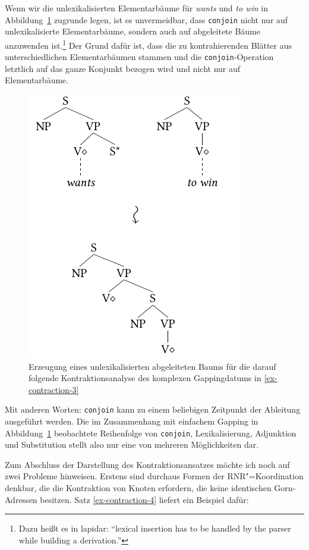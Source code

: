 Wenn wir die unlexikalisierten Elementarbäume für {\it wants} und {\it to win} in Abbildung~\ref{fig-contraction-4} zugrunde legen, ist es unvermeidbar, dass {\tt conjoin} nicht nur auf unlexikalisierte Elementarbäume, sondern auch auf abgeleitete Bäume anzuwenden ist.\footnote{Dazu hei\ss t es in \citet[21]{Sarkar:Joshi:97} lapidar: "`lexical insertion has to be handled by the parser while building a derivation."'} Der Grund dafür ist, dass die zu kontrahierenden Blätter aus unterschiedlichen Elementarbäumen stammen und die {\tt conjoin}-Operation letztlich auf das ganze Konjunkt bezogen wird und nicht nur auf Elementarbäume.
\begin{figure}[t]
\centering
\includegraphics{graphics/abb89.pdf}
\caption{\label{fig-contraction-4}Erzeugung eines unlexikalisierten abgeleiteten Baums für die darauf folgende Kontraktionsanalyse des komplexen Gappingdatums in \ref{ex-contraction-3}}
\end{figure}
Mit anderen Worten: {\tt conjoin} kann zu einem beliebigen Zeitpunkt der Ableitung ausgeführt werden. Die im Zusammenhang mit einfachem Gapping in Abbildung~\ref{fig-contraction-4} beobachtete Reihenfolge von {\tt conjoin}, Lexikalisierung, Adjunktion und Substitution stellt also nur eine von mehreren Möglichkeiten dar.%

Zum Abschluss der Darstellung des Kontraktionsansatzes möchte ich noch auf zwei Probleme hinweisen. Erstens sind durchaus Formen der RNR"=Koordination denkbar, die die Kontraktion von Knoten erfordern, die keine identischen Gorn-Adressen besitzen. Satz \ref{ex-contraction-4} liefert ein Beispiel dafür:  

